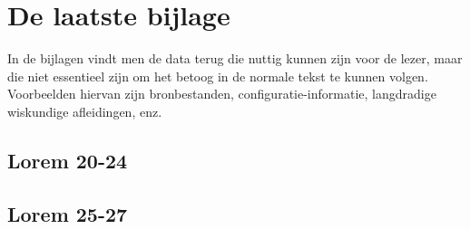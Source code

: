 \chapter{De laatste bijlage}
\label{app:n}
In de bijlagen vindt men de data terug die nuttig kunnen zijn voor de
lezer, maar die niet essentieel zijn om het betoog in de normale tekst te
kunnen volgen. Voorbeelden hiervan zijn bronbestanden,
configuratie-informatie, langdradige wiskundige afleidingen, enz.

\section{Lorem 20-24}

\section{Lorem 25-27}

